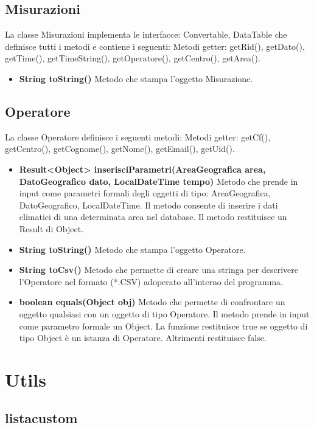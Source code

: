 \documentclass[a4paper, 12pt]{report}
\begin{document}
			\subsection{Misurazioni}
			La classe Misurazioni implementa le interfacce: Convertable, DataTable che definisce tutti i metodi e contiene i seguenti:
			Metodi getter: getRid(), getDato(), getTime(), getTimeString(), getOperatore(), getCentro(), getArea().
			\begin{itemize}
			\item \textbf{String toString()}
			Metodo che stampa l'oggetto Misurazione.
			\end{itemize}
			
			\subsection{Operatore}
			La classe Operatore definisce i seguenti metodi:
			Metodi getter: getCf(), getCentro(), getCognome(), getNome(), getEmail(), getUid().
			\begin{itemize}
			\item \textbf{Result<Object> inserisciParametri(AreaGeografica area, DatoGeografico dato, LocalDateTime tempo)}	
			Metodo che prende in input come parametri formali degli oggetti di tipo: AreaGeografica, DatoGeografico, LocalDateTime.
			Il metodo consente di inserire i dati climatici di una determinata area nel database. Il metodo restituisce un Result di Object.
			\item \textbf{String toString()}
			Metodo che stampa l'oggetto Operatore.	
			\item \textbf{String toCsv()}	
			Metodo che permette di creare una stringa per descrivere l'Operatore nel formato (*.CSV) adoperato all'interno del programma.
			\item \textbf{boolean equals(Object obj)}	
			Metodo che permette di confrontare un oggetto qualsiasi con un oggetto di tipo Operatore. Il metodo prende in input come parametro formale un Object. La funzione restituisce true se oggetto di tipo Object è un istanza di Operatore. Altrimenti restituisce false. 
			
			\end{itemize}

		\section{Utils}
			\subsection{listacustom}
\end{document}
